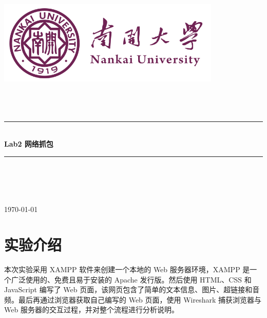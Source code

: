 \documentclass[UTF8,a4paper,10pt]{ctexart}
\newcommand{\HRule}{\rule{\linewidth}{0.5mm}}%
\begin{document}
\begin{titlepage}
    \begin{center}
    \includegraphics[width=0.8\textwidth]{NKU.png}\\[1cm]    
    \textsc{\Huge {} }\\[0.9cm]
    \textsc{\huge {}}\\[0.9cm]
    \textsc{\huge {}}\\[0.8cm]
    \HRule \\[0.9cm]
    { \LARGE \bfseries Lab2 网络抓包}\\[0.4cm]
    \HRule \\[2.0cm]
    \centering
    \textsc{\LARGE {}}\\[0.5cm]
    \textsc{\LARGE {}}\\[0.5cm]
    \textsc{\LARGE {}}\\[0.5cm]
    \vfill
    {\Large \today}
    \end{center}
\end{titlepage}



\newpage
\tableofcontents
\setcounter{page}{1}

\vspace{1cm}

\section{实验介绍}
本次实验采用 XAMPP 软件来创建一个本地的 Web 服务器环境，XAMPP 是一个广泛使用的、免费且易于安装的 Apache 发行版。然后使用 HTML、CSS 和 JavaScript 编写了 Web 页面，该网页包含了简单的文本信息、图片、超链接和音频。最后再通过浏览器获取自己编写的 Web 页面，使用 Wireshark 捕获浏览器与 Web 服务器的交互过程，并对整个流程进行分析说明。\par
\end{document}
